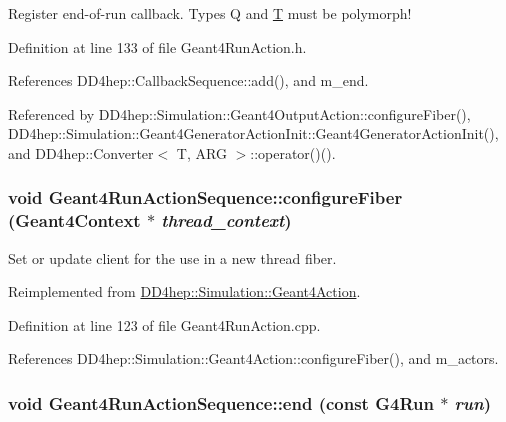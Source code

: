 Register end-\/of-\/run callback. Types Q and \hyperlink{class_t}{T} must be polymorph! 

Definition at line 133 of file Geant4RunAction.h.

References DD4hep::CallbackSequence::add(), and m\_\-end.

Referenced by DD4hep::Simulation::Geant4OutputAction::configureFiber(), DD4hep::Simulation::Geant4GeneratorActionInit::Geant4GeneratorActionInit(), and DD4hep::Converter$<$ T, ARG $>$::operator()().\hypertarget{class_d_d4hep_1_1_simulation_1_1_geant4_run_action_sequence_adf657c521620857ffed702783c0a2712}{
\subsubsection[{configureFiber}]{\setlength{\rightskip}{0pt plus 5cm}void Geant4RunActionSequence::configureFiber ({\bf Geant4Context} $\ast$ {\em thread\_\-context})}}
\label{class_d_d4hep_1_1_simulation_1_1_geant4_run_action_sequence_adf657c521620857ffed702783c0a2712}


Set or update client for the use in a new thread fiber. 

Reimplemented from \hyperlink{class_d_d4hep_1_1_simulation_1_1_geant4_action_a6adc7138508303e4e417cb48a737ab19}{DD4hep::Simulation::Geant4Action}.

Definition at line 123 of file Geant4RunAction.cpp.

References DD4hep::Simulation::Geant4Action::configureFiber(), and m\_\-actors.\hypertarget{class_d_d4hep_1_1_simulation_1_1_geant4_run_action_sequence_a2a21cad772d05ac39502c35e334c6e5f}{
\subsubsection[{end}]{\setlength{\rightskip}{0pt plus 5cm}void Geant4RunActionSequence::end (const G4Run $\ast$ {\em run})}}
\label{class_d_d4hep_1_1_simulation_1_1_geant4_run_action_sequence_a2a21cad772d05ac39502c35e334c6e5f}


